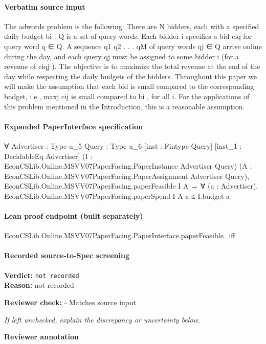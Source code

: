 \documentclass[10pt]{article}
\newcommand{\reviewerbox}{%
  \par\noindent\fbox{\parbox{0.96\linewidth}{\rule{0pt}{0.38in}}}\par
}
\newcommand{\reviewmatch}[1]{%
  \par\noindent\textbf{Reviewer check:} $\square$\; #1\par
  \noindent\emph{If left unchecked, explain the discrepancy or uncertainty below.}\par
}
\begin{document}
\paragraph{Verbatim source input}
\begin{ReviewVerbatim}
The adwords problem is the following: There are N bidders, each with a specified daily budget
bi . Q is a set of query words. Each bidder i specifies a bid ciq for query word q ∈ Q. A
sequence q1 q2 . . . qM of query words qj ∈ Q arrive online during the day, and each query qj
must be assigned to some bidder i (for a revenue of ciqj ). The objective is to maximize the
total revenue at the end of the day while respecting the daily budgets of the bidders.
Throughout this paper we will make the assumption that each bid is small compared to the
corresponding budget, i.e., maxj cij is small compared to bi , for all i. For the applications of
this problem mentioned in the Introduction, this is a reasonable assumption.
\end{ReviewVerbatim}


\paragraph{Expanded PaperInterface specification}
\begin{ReviewVerbatim}
∀ {Advertiser : Type u_5} {Query : Type u_6} [inst : Fintype Query] [inst_1 : DecidableEq Advertiser]
  (I : EconCSLib.Online.MSVV07PaperFacing.PaperInstance Advertiser Query)
  (A : EconCSLib.Online.MSVV07PaperFacing.PaperAssignment Advertiser Query),
  EconCSLib.Online.MSVV07PaperFacing.paperFeasible I A ↔
    ∀ (a : Advertiser), EconCSLib.Online.MSVV07PaperFacing.paperSpend I A a ≤ I.budget a
\end{ReviewVerbatim}

\paragraph{Lean proof endpoint (built separately)}\begin{ReviewVerbatim}
EconCSLib.Online.MSVV07PaperFacing.PaperInterface.paperFeasible_iff
\end{ReviewVerbatim}

\paragraph{Recorded source-to-Spec screening}
\textbf{Verdict:} \texttt{not recorded}
\\
\textbf{Reason:} not recorded
\reviewmatch{Matches source input}
\noindent\textbf{Reviewer annotation}\par
\reviewerbox
\clearpage
\hypertarget{source-claim-f5934aa4b89a27d9}{}
\end{document}
